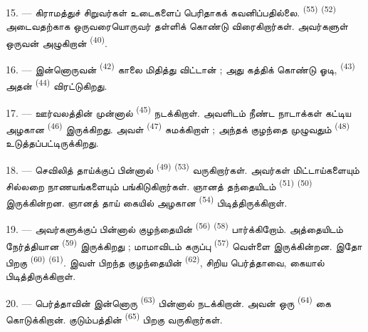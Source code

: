 15. --- கிராமத்துச் சிறுவர்கள் உடைகளைப் பெரிதாகக் கவனிப்பதில்லை.
 \textsuperscript{(55)} 
\textsuperscript{(52)} அடைவதற்காக ஒருவரையொருவர் தள்ளிக் கொண்டு விரைகிறார்கள்.
அவர்களுள் ஒருவன் அழுகிறான் \textsuperscript{(40)}.

16. --- இன்னொருவன்  \textsuperscript{(42)} காலை மிதித்து
விட்டான் ; அது கத்திக் கொண்டு ஓடி,  \textsuperscript{(43)}
அதன்  \textsuperscript{(44)} விரட்டுகிறது.

\VUsaut{5.0mm}
\VUsaut{4.0mm}

17. --- ஊர்வலத்தின் முன்னால்  \textsuperscript{(45)}
நடக்கிறாள். அவளிடம் நீண்ட நாடாக்கள் கட்டிய அழகான 
\textsuperscript{(46)} இருக்கிறது. அவள் 
\textsuperscript{(47)} சுமக்கிறாள் ; அந்தக் குழந்தை முழுவதும்
 \textsuperscript{(48)} உடுத்தப்பட்டிருக்கிறது.

18. --- செவிலித் தாய்க்குப் பின்னால் 
\textsuperscript{(49)}  \textsuperscript{(53)}
வருகிறார்கள். அவர்கள் மிட்டாய்களையும் சில்லறை நாணயங்களையும்
பங்கிடுகிறார்கள். ஞானத் தந்தையிடம்  \textsuperscript{(51)}
 \textsuperscript{(50)} இருக்கின்றன. ஞானத் தாய்
கையில் அழகான  \textsuperscript{(54)} பிடித்திருக்கிறாள்.

19. --- அவர்களுக்குப் பின்னால் குழந்தையின் 
\textsuperscript{(56)}  \textsuperscript{(58)}
பார்க்கிறோம். அத்தையிடம் நேர்த்தியான  \textsuperscript{(59)}
இருக்கிறது ; மாமாவிடம் கருப்பு  \textsuperscript{(57)}
வெள்ளை  இருக்கின்றன. இதோ பிறகு  \textsuperscript{(60)} 
\textsuperscript{(61)}. இவள் பிறந்த குழந்தையின் 
\textsuperscript{(62)}, சிறிய பெர்த்தாவை, கையால் பிடித்திருக்கிறாள்.

20. --- பெர்த்தாவின் இன்னொரு  \textsuperscript{(63)}
பின்னால் நடக்கிறான். அவன் ஒரு  \textsuperscript{(64)}
கை கொடுக்கிறான். குடும்பத்தின்  \textsuperscript{(65)}
பிறகு வருகிறார்கள்.

\VUsaut{4.6mm}
\VUsaut{3.4mm}

